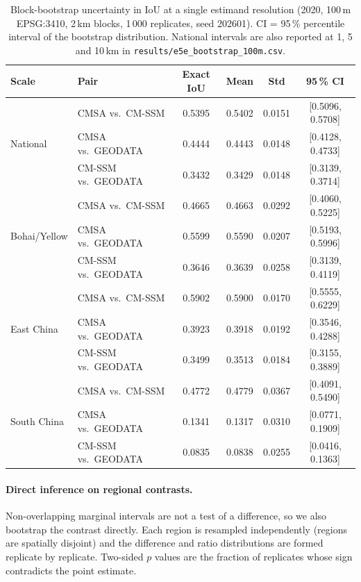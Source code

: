 \documentclass[11pt]{article}
\begin{document}
\begin{table}[htpb]
\centering
\caption{\label{tab:bootstrap}Block-bootstrap uncertainty in IoU at a single
  estimand resolution (2020, 100\,m EPSG:3410, 2\,km blocks, 1\,000
  replicates, seed 202601). CI = 95\,\% percentile interval of the bootstrap
  distribution. National intervals are also reported at 1, 5 and 10\,km in
  \texttt{results/e5e\_bootstrap\_100m.csv}.}
\begin{tabular}{l l c c c c}
\toprule
Scale & Pair & Exact IoU & Mean & Std & 95\,\% CI \\
\midrule
\multirow{3}{*}{National}
  & CMSA vs.\ CM-SSM & 0.5395 & 0.5402 & 0.0151 & [0.5096, 0.5708] \\
  & CMSA vs.\ GEODATA & 0.4444 & 0.4443 & 0.0148 & [0.4128, 0.4733] \\
  & CM-SSM vs.\ GEODATA & 0.3432 & 0.3429 & 0.0148 & [0.3139, 0.3714] \\
\midrule
\multirow{3}{*}{Bohai/Yellow}
  & CMSA vs.\ CM-SSM & 0.4665 & 0.4663 & 0.0292 & [0.4060, 0.5225] \\
  & CMSA vs.\ GEODATA & 0.5599 & 0.5590 & 0.0207 & [0.5193, 0.5996] \\
  & CM-SSM vs.\ GEODATA & 0.3646 & 0.3639 & 0.0258 & [0.3139, 0.4119] \\
\midrule
\multirow{3}{*}{East China}
  & CMSA vs.\ CM-SSM & 0.5902 & 0.5900 & 0.0170 & [0.5555, 0.6229] \\
  & CMSA vs.\ GEODATA & 0.3923 & 0.3918 & 0.0192 & [0.3546, 0.4288] \\
  & CM-SSM vs.\ GEODATA & 0.3499 & 0.3513 & 0.0184 & [0.3155, 0.3889] \\
\midrule
\multirow{3}{*}{South China}
  & CMSA vs.\ CM-SSM & 0.4772 & 0.4779 & 0.0367 & [0.4091, 0.5490] \\
  & CMSA vs.\ GEODATA & 0.1341 & 0.1317 & 0.0310 & [0.0771, 0.1909] \\
  & CM-SSM vs.\ GEODATA & 0.0835 & 0.0838 & 0.0255 & [0.0416, 0.1363] \\
\bottomrule
\end{tabular}
\end{table}

\paragraph{Direct inference on regional contrasts.}
Non-overlapping marginal intervals are not a test of a difference, so we also
bootstrap the contrast directly. Each region is resampled independently
(regions are spatially disjoint) and the difference and ratio distributions
are formed replicate by replicate. Two-sided $p$ values are the fraction of
replicates whose sign contradicts the point estimate.
\end{document}
